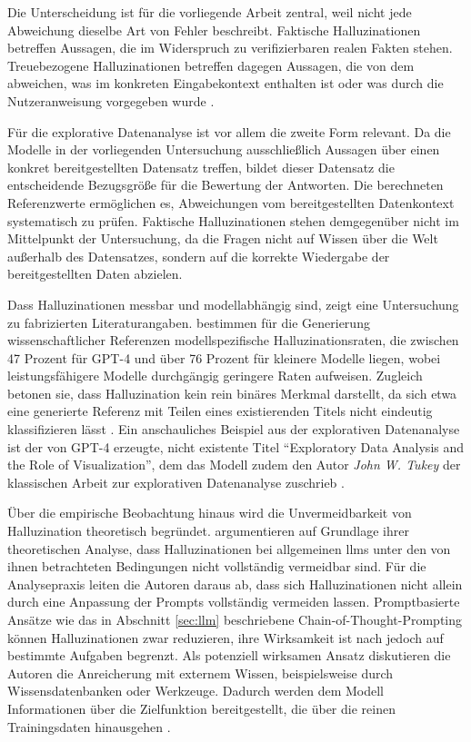 Die Unterscheidung ist für die vorliegende Arbeit zentral, weil nicht jede Abweichung dieselbe Art von Fehler beschreibt. Faktische Halluzinationen betreffen Aussagen, die im Widerspruch zu verifizierbaren realen Fakten stehen. Treuebezogene Halluzinationen betreffen dagegen Aussagen, die von dem abweichen, was im konkreten Eingabekontext enthalten ist oder was durch die Nutzeranweisung vorgegeben wurde \parencite{bai_hallucination_2025}.

Für die explorative Datenanalyse ist vor allem die zweite Form relevant. Da die Modelle in der vorliegenden Untersuchung ausschließlich Aussagen über einen konkret bereitgestellten Datensatz treffen, bildet dieser Datensatz die entscheidende Bezugsgröße für die Bewertung der Antworten. Die berechneten Referenzwerte ermöglichen es, Abweichungen vom bereitgestellten Datenkontext systematisch zu prüfen. Faktische Halluzinationen stehen demgegenüber nicht im Mittelpunkt der Untersuchung, da die Fragen nicht auf Wissen über die Welt außerhalb des Datensatzes, sondern auf die korrekte Wiedergabe der bereitgestellten Daten abzielen.

Dass Halluzinationen messbar und modellabhängig sind, zeigt eine Untersuchung zu fabrizierten Literaturangaben. \textcite{agrawal_language_2024} bestimmen für die Generierung wissenschaftlicher Referenzen modellspezifische Halluzinationsraten, die zwischen 47 Prozent für GPT-4 und über 76 Prozent für kleinere Modelle liegen, wobei leistungsfähigere Modelle durchgängig geringere Raten aufweisen. Zugleich betonen sie, dass Halluzination kein rein binäres Merkmal darstellt, da sich etwa eine generierte Referenz mit Teilen eines existierenden Titels nicht eindeutig klassifizieren lässt \parencite{agrawal_language_2024}. Ein anschauliches Beispiel aus der explorativen Datenanalyse ist der von GPT-4 erzeugte, nicht existente Titel \enquote{Exploratory Data Analysis and the Role of Visualization}, dem das Modell zudem den Autor \textit{John W. Tukey} der klassischen Arbeit zur explorativen Datenanalyse zuschrieb \parencite{agrawal_language_2024}.

Über die empirische Beobachtung hinaus wird die Unvermeidbarkeit von Halluzination theoretisch begründet. \textcite{xu_hallucination_2025} argumentieren auf Grundlage ihrer theoretischen Analyse, dass Halluzinationen bei allgemeinen \glspl{llm} unter den von ihnen betrachteten Bedingungen nicht vollständig vermeidbar sind. Für die Analysepraxis leiten die Autoren daraus ab, dass sich Halluzinationen nicht allein durch eine Anpassung der Prompts vollständig vermeiden lassen. Promptbasierte Ansätze wie das in Abschnitt \ref{sec:llm} beschriebene Chain-of-Thought-Prompting können Halluzinationen zwar reduzieren, ihre Wirksamkeit ist nach \textcite{xu_hallucination_2025} jedoch auf bestimmte Aufgaben begrenzt. Als potenziell wirksamen Ansatz diskutieren die Autoren die Anreicherung mit externem Wissen, beispielsweise durch Wissensdatenbanken oder Werkzeuge. Dadurch werden dem Modell Informationen über die Zielfunktion bereitgestellt, die über die reinen Trainingsdaten hinausgehen \parencite{xu_hallucination_2025}.

